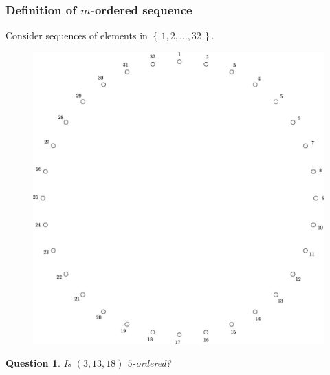 \documentclass{beamer}
\theoremstyle{plain}
\newtheorem{question}[theorem]{Question}
\theoremstyle{definition}
\theoremstyle{remark}
\renewcommand{\'}{\hspace{0.5mm}'}		%
\renewcommand{\Set}[1]{\left\{\,#1\,\right\}}	%
\begin{document}
\begin{frame}
\frametitle{Definition of $m$-ordered sequence}

	Consider sequences of elements in $\Set{1,2,\hdots, 32}$. 

	\begin{figure}
		\includegraphics[scale=0.1]{circ_32_3_12_12_5.jpg}
	\end{figure}
	
	\begin{question}
		Is $(3,13,18)$ $5$-ordered?
	\end{question}
	
\end{frame}

\end{document}
